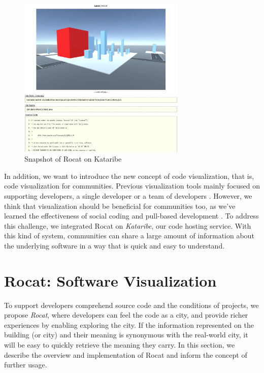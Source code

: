 \documentclass[conference]{IEEEtran}
\begin{document}
\begin{figure}[tb]
\centering
\includegraphics[width=8cm]{Rocat-on-kataribe2.pdf}
\caption{Snapshot of Rocat on Kataribe}
\label{figure:Rocat-on-kataribe}
\end{figure}


In addition, we want to introduce the new concept of code visualization, that is, code visualization for communities.
Previous visualization tools mainly focused on supporting developers, a single developer \cite{Wettel:2011:SSC:1985793.1985868} or a team of developers \cite{6648194}.
However, we think that visualization should be beneficial for communities too, as we've learned the effectiveness of social coding \cite{Dabbish:2012:SCG:2145204.2145396} and pull-based development \cite{Gousios:2014:ESP:2568225.2568260}.
To address this challenge, we integrated Rocat on \textit{Kataribe},  our code hosting service.
With this kind of system, communities can share a large amount of information about the underlying software in a way that is quick and easy to understand.

\section{Rocat: Software Visualization}
To support developers comprehend source code and the conditions of projects, we propose \textit{Rocat}, where developers can feel the code as a city, and provide richer experiences by enabling exploring the city.
If the information represented on the building (or city) and their meaning is synonymous with the real-world city, it will be easy to quickly retrieve the meaning they carry.
In this section, we describe the overview and implementation of Rocat and inform the concept of further usage.
\end{document}
